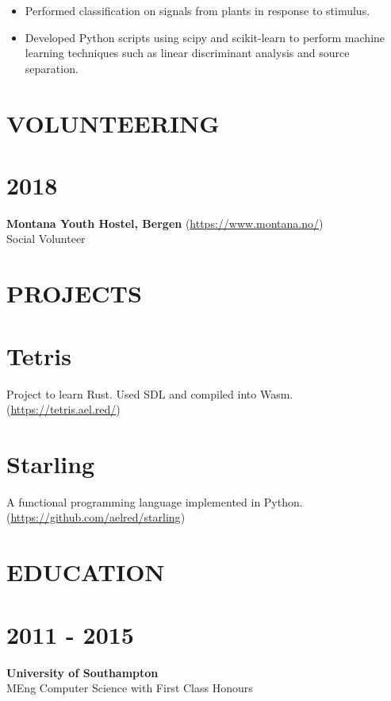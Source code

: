 \documentclass[margin]{res}
\begin{document}
\begin{resume}
\begin{itemize}

\item
Performed classification on signals from plants in response to stimulus.

\item
Developed Python scripts using scipy and scikit-learn to perform machine learning techniques such as linear discriminant analysis and source separation.

\end{itemize}

\section{VOLUNTEERING}

\normalsize{\section{2018}}
{\bf Montana Youth Hostel, Bergen} (\href{https://www.montana.no/}{https://www.montana.no/}) \\
Social Volunteer

\section{PROJECTS}

\normalsize{\section{Tetris}}
Project to learn Rust. Used SDL and compiled into Wasm. (\href{https://tetris.ael.red/}{https://tetris.ael.red/})

\normalsize{\section{Starling}}
A functional programming language implemented in Python. (\href{https://github.com/aelred/starling}{https://github.com/aelred/starling})

\section{EDUCATION}
\normalsize{\section{2011 - 2015}}
{\bf University of Southampton} \\
MEng Computer Science with First Class Honours \\


\end{resume}
\end{document}
